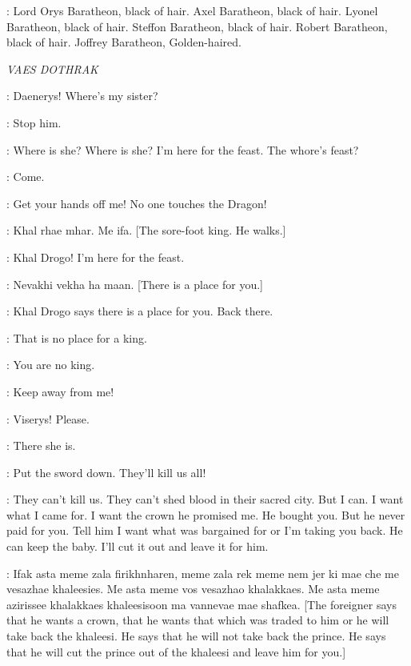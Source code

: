 \NED: Lord Orys Baratheon, black of hair. Axel Baratheon, black of hair. Lyonel Baratheon, black of hair. Steffon Baratheon, black of hair. Robert Baratheon, black of hair. Joffrey Baratheon, Golden-haired. 


\scene

\textit{VAES DOTHRAK} 


\VISERYS: Daenerys! Where's my sister? 

\DAENERYS:  Stop him. 

\VISERYS: Where is she? Where is she? I'm here for the feast. The whore's feast? 


\JORAH: Come. 

\VISERYS: Get your hands off me! No one touches the Dragon! 

\QOTHO: Khal rhae mhar. Me ifa. [The sore-foot king. He walks.] 

\VISERYS: Khal Drogo! I'm here for the feast.

\DROGO: Nevakhi vekha ha maan. [There is a place for you.] 

\JORAH: Khal Drogo says there is a place for you. Back there. 

\VISERYS: That is no place for a king. 

\DROGO: You are no king. 


\VISERYS: Keep away from me! 

\DAENERYS: Viserys! Please. 

\VISERYS:  There she is. 

\JORAH: Put the sword down. They'll kill us all! 

\VISERYS: They can't kill us. They can't shed blood in their sacred city. But I can. I want what I came for. I want the crown he promised me. He bought you. But he never paid for you. Tell him I want what was bargained for or I'm taking you back. He can keep the baby. I'll cut it out and leave it for him. 

\IRRI: Ifak asta meme zala firikhnharen, meme zala rek meme nem jer ki mae che me vesazhae khaleesies. Me asta meme vos vesazhao khalakkaes. Me asta meme azirissee khalakkaes khaleesisoon ma vannevae mae shafkea. [The foreigner says that he wants a crown, that he wants that which was traded to him or he will take back the khaleesi. He says that he will not take back the prince. He says that he will cut the prince out of the khaleesi and leave him for you.] 

